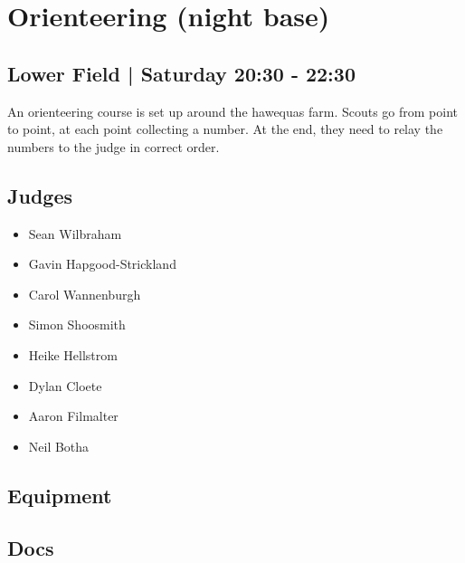 \documentclass[10pt]{article}
\begin{document}
		\begin{minipage}{\linewidth}
		\setcounter{section}{23}
	\section{Orienteering (night base) }
	\subsection*{Lower Field | Saturday 20:30 - 22:30}

	An orienteering course is set up around the hawequas farm. Scouts go from point to point, at each point collecting a number. At the end, they need to relay the numbers to the judge in correct order.

	\begin{multicols}{2}
	\subsection*{\faUsers \: Judges}
	\begin{itemize}
			\item Sean Wilbraham
			\item Gavin Hapgood-Strickland
			\item Carol Wannenburgh
			\item Simon Shoosmith
			\item Heike Hellstrom
			\item Dylan Cloete
			\item Aaron Filmalter
			\item Neil Botha
		\end{itemize}
	\columnbreak
	\subsection*{\faWrench \: Equipment}
	        \vfill\null
        \subsection*{\faFile \: Docs}
     	\end{multicols}


	\vspace{1cm}
	\end{minipage}
\end{document}
